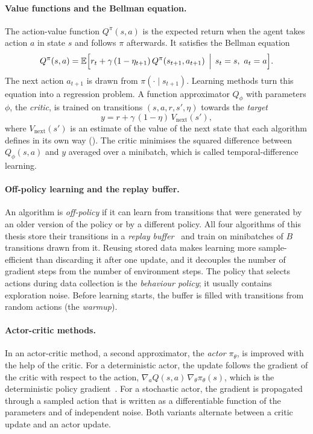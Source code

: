 \paragraph{Value functions and the Bellman equation.} The action-value function $Q^{\pi}(s,a)$ is the expected return when the agent takes action $a$ in state $s$ and follows $\pi$ afterwards.
It satisfies the Bellman equation
\begin{equation}
  Q^{\pi}(s,a) = \mathbb{E}\Bigl[r_t + \gamma\,(1-\eta_{t+1})\,Q^{\pi}(s_{t+1},a_{t+1}) \,\Bigm|\, s_t = s,\ a_t = a\Bigr] .
  \label{eq:bg-bellman}
\end{equation}
The next action $a_{t+1}$ is drawn from $\pi(\cdot \mid s_{t+1})$.
Learning methods turn this equation into a regression problem.
A function approximator $Q_{\phi}$ with parameters $\phi$, the \emph{critic}, is trained on transitions $(s,a,r,s',\eta)$ towards the \emph{target}
\begin{equation}
  y = r + \gamma\,(1-\eta)\,V_{\mathrm{next}}(s'),
  \label{eq:bg-td-target}
\end{equation}
where $V_{\mathrm{next}}(s')$ is an estimate of the value of the next state that each algorithm defines in its own way ().
The critic minimises the squared difference between $Q_{\phi}(s,a)$ and $y$ averaged over a minibatch, which is called temporal-difference learning.

\paragraph{Off-policy learning and the replay buffer.} An algorithm is \emph{off-policy} if it can learn from transitions that were generated by an older version of the policy or by a different policy.
All four algorithms of this thesis store their transitions in a \emph{replay buffer}~\cite{lin1992replay} and train on minibatches of $B$ transitions drawn from it.
Reusing stored data makes learning more sample-efficient than discarding it after one update, and it decouples the number of gradient steps from the number of environment steps.
The policy that selects actions during data collection is the \emph{behaviour policy}; it usually contains exploration noise.
Before learning starts, the buffer is filled with transitions from random actions (the \emph{warmup}).

\paragraph{Actor-critic methods.} In an actor-critic method, a second approximator, the \emph{actor} $\pi_{\theta}$, is improved with the help of the critic.
For a deterministic actor, the update follows the gradient of the critic with respect to the action, $\nabla_a Q(s,a)\,\nabla_{\theta}\pi_{\theta}(s)$, which is the deterministic policy gradient~\cite{silver2014dpg,lillicrap2016ddpg}.
For a stochastic actor, the gradient is propagated through a sampled action that is written as a differentiable function of the parameters and of independent noise.
Both variants alternate between a critic update and an actor update.

